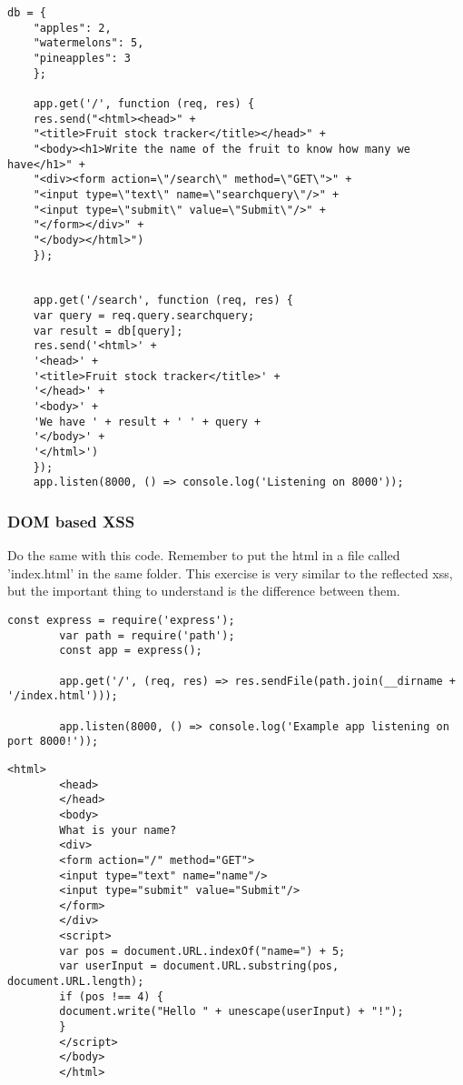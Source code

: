 \begin{Exercise}[label={websec-xss-types}]
\begin{lstlisting}[style=JavaScript]
	db = {
	"apples": 2,
	"watermelons": 5,
	"pineapples": 3
	};
	
	app.get('/', function (req, res) {
	res.send("<html><head>" +
	"<title>Fruit stock tracker</title></head>" +
	"<body><h1>Write the name of the fruit to know how many we have</h1>" +
	"<div><form action=\"/search\" method=\"GET\">" +
	"<input type=\"text\" name=\"searchquery\"/>" +
	"<input type=\"submit\" value=\"Submit\"/>" +
	"</form></div>" +
	"</body></html>")
	});
	
	
	app.get('/search', function (req, res) {
	var query = req.query.searchquery;
	var result = db[query];
	res.send('<html>' +
	'<head>' +
	'<title>Fruit stock tracker</title>' +
	'</head>' +
	'<body>' +
	'We have ' + result + ' ' + query +
	'</body>' +
	'</html>')
	});
	app.listen(8000, () => console.log('Listening on 8000'));
	\end{lstlisting}
	

	\subsubsection{DOM based XSS}
		Do the same with this code. Remember to put the html in a file called 'index.html' in the same folder. This exercise is very similar to the reflected xss, but the important thing to understand is the difference between them.
		\begin{lstlisting}[style=JavaScript]
		const express = require('express');
		var path = require('path');
		const app = express();
		
		app.get('/', (req, res) => res.sendFile(path.join(__dirname + '/index.html')));
		
		app.listen(8000, () => console.log('Example app listening on port 8000!'));
		\end{lstlisting}
		\begin{lstlisting}[style=JavaScript]
		<html>
		<head>
		</head>
		<body>
		What is your name?
		<div>
		<form action="/" method="GET">
		<input type="text" name="name"/>
		<input type="submit" value="Submit"/>
		</form>
		</div>
		<script>
		var pos = document.URL.indexOf("name=") + 5;
		var userInput = document.URL.substring(pos, document.URL.length);
		if (pos !== 4) {
		document.write("Hello " + unescape(userInput) + "!");
		}
		</script>
		</body>
		</html>
		\end{lstlisting}
\end{Exercise}

